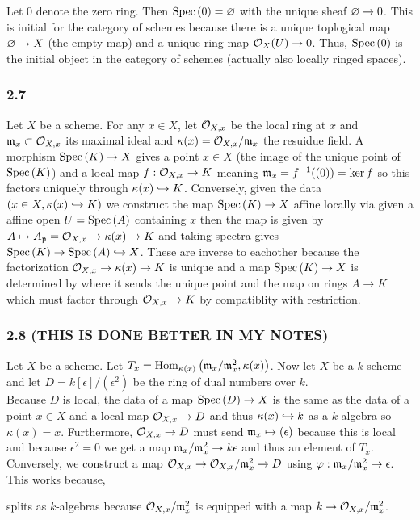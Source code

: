 \documentclass[12pt]{article}
\begin{document}
Let $0$ denote the zero ring. Then $\mathrm{Spec}\left( 0 \right) = \varnothing$ with the unique sheaf $\varnothing \to 0$. This is initial for the category of schemes because there is a unique toplogical map $\varnothing \to X$ (the empty map) and a unique ring map $\mathcal{O}_{X}(U) \to 0$. Thus, $\mathrm{Spec}\left( 0 \right)$ is the initial object in the category of schemes (actually also locally ringed spaces).

\subsubsection{2.7}

Let $X$ be a scheme. For any $x \in X$, let $\mathcal{O}_{X, x}$ be the local ring at $x$ and $\mathfrak{m}_x \subset \mathcal{O}_{X, x}$ its maximal ideal and $\kappa(x) = \mathcal{O}_{X, x} / \mathfrak{m}_x$ the resuidue field. A morphism $\mathrm{Spec}\left( K \right) \to X$ gives a point $x \in X$ (the image of the unique point of $\mathrm{Spec}\left( K \right)$) and a local map $f : \mathcal{O}_{X, x} \to K$ meaning $\mathfrak{m}_x = f^{-1}((0)) = \ker{f}$ so this factors uniquely through $\kappa(x) \hookrightarrow K$. Conversely, given the data $(x \in X, \kappa(x) \hookrightarrow K)$ we construct the map $\mathrm{Spec}\left( K \right) \to X$ affine locally via given a affine open $U = \mathrm{Spec}\left( A \right)$ containing $x$ then the map is given by $A \mapsto A_{\mathfrak{p}} = \mathcal{O}_{X, x} \to \kappa(x) \to K$ and taking spectra gives $\mathrm{Spec}\left( K \right) \to \mathrm{Spec}\left( A \right) \hookrightarrow X$. These are inverse to eachother because the factorization $\mathcal{O}_{X, x} \to \kappa(x) \to K$ is unique and a map $\mathrm{Spec}\left( K \right) \to X$ is determined by where it sends the unique point and the map on rings $A \to K$ which must factor through $\mathcal{O}_{X, x} \to K$ by compatiblity with restriction. 

\subsubsection{2.8 (THIS IS DONE BETTER IN MY NOTES)}

Let $X$ be a scheme. Let $T_x = \mathrm{Hom}_{\kappa(x)} \left( \mathfrak{m}_x / \mathfrak{m}_x^2, \kappa(x) \right)$. Now let $X$ be a $k$-scheme and let $D = k[\epsilon]/(\epsilon^2)$ be the ring of dual numbers over $k$.
\bigskip\\
Because $D$ is local, the data of a map $\mathrm{Spec}\left( D \right) \to X$ is the same as the data of a point $x \in X$ and a local map $\mathcal{O}_{X, x} \to D$ and thus $\kappa(x) \hookrightarrow k$ as a $k$-algebra so $\kappa(x) = x$. Furthermore, $\mathcal{O}_{X, x} \to D$ must send $\mathfrak{m}_x \mapsto (\epsilon)$ because this is local and because $\epsilon^2 = 0$ we get a map $\mathfrak{m}_x / \mathfrak{m}_x^2 \to k \epsilon$ and thus an element of $T_x$. Conversely, we construct a map $\mathcal{O}_{X, x} \to \mathcal{O}_{X, x} / \mathfrak{m}_x^2 \to D$ using $\varphi : \mathfrak{m}_x / \mathfrak{m}_x^2 \to \epsilon$. This works because,
\begin{center}
\end{center} 
splits as $k$-algebras because $\mathcal{O}_{X, x}/\mathfrak{m}_x^2$ is equipped with a map $k \to \mathcal{O}_{X, x}/ \mathfrak{m}_x^2$. 
\end{document}
